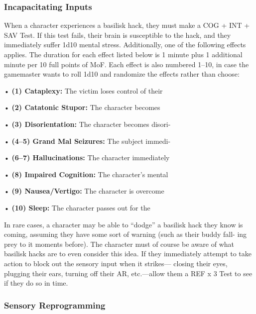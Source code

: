 \subsubsection{Incapacitating Inputs}

When a character experiences a basilisk hack, they 
must make a COG + INT + SAV Test. If this test 
fails, their brain is susceptible to the hack, and they 
immediately suffer 1d10 mental stress. Additionally, 
one of the following effects applies. The duration for 
each effect listed below is 1 minute plus 1 additional 
minute per 10 full points of MoF. Each effect is also 
numbered 1–10, in case the gamemaster wants to roll 
1d10 and randomize the effects rather than choose:

•  \textbf{(1) Cataplexy: }The victim loses control of their 

•  \textbf{(2) Catatonic Stupor:} The character becomes 

•  \textbf{(3) Disorientation:} The character becomes disori-

•  \textbf{(4–5) Grand Mal Seizures:} The subject immedi-

•  \textbf{(6–7) Hallucinations:} The character immediately 

•  \textbf{(8) Impaired Cognition:} The character's mental 

•  \textbf{(9) Nausea/Vertigo:} The character is overcome 

•  \textbf{(10) Sleep:} The character passes out for the 

In rare cases, a character may be able to ``dodge'' 
a basilisk hack they know is coming, assuming they 
have some sort of warning (such as their buddy fall-
ing prey to it moments before). The character must of 
course be aware of what basilisk hacks are to even 
consider this idea. If they immediately attempt to take 
action to block out the sensory input when it strikes—
closing their eyes, plugging their ears, turning off their 
AR, etc.—allow them a REF x 3 Test to see if they do 
so in time. 

\subsubsection{Sensory Reprogramming}

